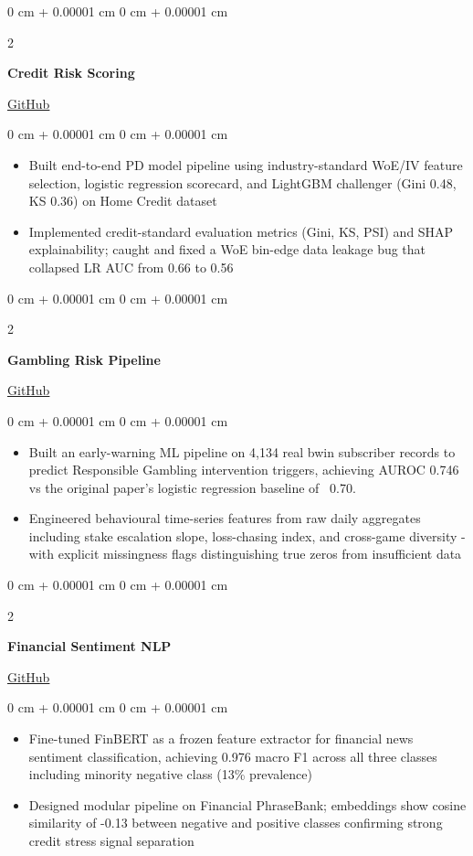 \documentclass[10pt, letterpaper]{article}
\newenvironment{onecolentry}{
    \begin{adjustwidth}{
        0 cm + 0.00001 cm
    }{
        0 cm + 0.00001 cm
    }
}{
    \end{adjustwidth}
}
\newenvironment{twocolentry}[2][]{
    \onecolentry
    \def\secondColumn{#2}
    \setcolumnwidth{\fill, 4.5 cm}
    \begin{paracol}{2}
}{
    \switchcolumn \raggedleft \secondColumn
    \end{paracol}
    \endonecolentry
}
\begin{document}
\begin{twocolentry}{
    \href{https://github.com/NguyenIslandBoy/credit_risk_scoring}{GitHub}
    }
\textbf{Credit Risk Scoring}
\end{twocolentry}
\begin{onecolentry}
\begin{itemize}
    \item Built end-to-end PD model pipeline using industry-standard WoE/IV feature selection, logistic regression scorecard, and LightGBM challenger (Gini 0.48, KS 0.36) on Home Credit dataset
    \item Implemented credit-standard evaluation metrics (Gini, KS, PSI) and SHAP explainability; caught and fixed a WoE bin-edge data leakage bug that collapsed LR AUC from 0.66 to 0.56
\end{itemize}
\end{onecolentry}
\vspace{0.15cm}

\begin{twocolentry}{
    \href{https://github.com/NguyenIslandBoy/gambling-risk-pipeline}{GitHub}
    }
\textbf{Gambling Risk Pipeline}
\end{twocolentry}
\begin{onecolentry}
\begin{itemize}
    \item Built an early-warning ML pipeline on 4,134 real bwin subscriber records to predict Responsible Gambling intervention triggers, achieving AUROC 0.746 vs the original paper's logistic regression baseline of ~0.70.
    \item Engineered behavioural time-series features from raw daily aggregates including stake escalation slope, loss-chasing index, and cross-game diversity - with explicit missingness flags distinguishing true zeros from insufficient data
\end{itemize}
\end{onecolentry}
\vspace{0.15cm}

\begin{twocolentry}{
    \href{https://github.com/NguyenIslandBoy/financial_sentiment_nlp}{GitHub}
    }
\textbf{Financial Sentiment NLP}
\end{twocolentry}
\begin{onecolentry}
\begin{itemize}
    \item Fine-tuned FinBERT as a frozen feature extractor for financial news sentiment classification, achieving 0.976 macro F1 across all three classes including minority negative class (13\% prevalence)
    \item Designed modular pipeline on Financial PhraseBank; embeddings show cosine similarity of -0.13 between negative and positive classes confirming strong credit stress signal separation
\end{itemize}
\end{onecolentry}
\vspace{0.15cm}
\end{document}

